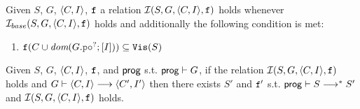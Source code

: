 \documentclass[12pt]{article}
\begin{document}
\begin{definition}
  \label{def:sim-rel}
  Given $S$, $G$, $\langle C, I \rangle$, ${\mathtt{f}}$ a relation $\mathcal{I}(S, G, \langle C, I \rangle, {\mathtt{f}})$ holds
  whenever $\mathcal{I}_{base}(S, G, \langle C, I \rangle, {\mathtt{f}})$ holds and additionally
  the following condition is met:
  \begin{enumerate}[label=\textbf{S.\arabic*},start=8]
    \item \label{item:sim-vis}
       $\f(C \cup \dom{G.\lPO^?;[I]}) \subseteq \lVIS(S)$
  \end{enumerate}
\end{definition}

\begin{lemma}
  \label{lemma:sim-step}
  Given $S$, $G$, $\langle C, I \rangle$, ${\mathtt{f}}$, and $\mathsf{prog}$ 
  s.t. $\mathsf{prog} \vdash G$,
  if the relation $\mathcal{I}(S, G, \langle C, I \rangle, {\mathtt{f}})$ holds
  and $G \vdash \langle C, I \rangle \longrightarrow \langle C', I' \rangle$
  then there exists $S'$ and ${\mathtt{f}}'$ s.t.
  $\mathsf{prog} \vdash S \longrightarrow^* S'$ and
  $\mathcal{I}(S, G, \langle C, I \rangle, {\mathtt{f}})$ holds.
\end{lemma}

  




          
\end{document}
